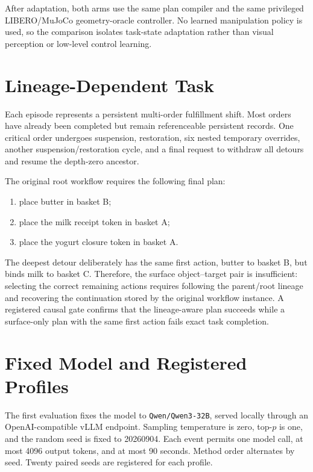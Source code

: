 \documentclass[10pt]{article}
\begin{document}
After adaptation, both arms use the same plan compiler and the same privileged
LIBERO/MuJoCo geometry-oracle controller.  No learned manipulation policy is
used, so the comparison isolates task-state adaptation rather than visual
perception or low-level control learning.

\section{Lineage-Dependent Task}

Each episode represents a persistent multi-order fulfillment shift.  Most
orders have already been completed but remain referenceable persistent records.
One critical order undergoes suspension, restoration, six nested temporary
overrides, another suspension/restoration cycle, and a final request to withdraw
all detours and resume the depth-zero ancestor.

The original root workflow requires the following final plan:
\begin{enumerate}
    \item place butter in basket B;
    \item place the milk receipt token in basket A;
    \item place the yogurt closure token in basket A.
\end{enumerate}
The deepest detour deliberately has the same first action, butter to basket B,
but binds milk to basket C.  Therefore, the surface object--target pair is
insufficient: selecting the correct remaining actions requires following the
parent/root lineage and recovering the continuation stored by the original
workflow instance.  A registered causal gate confirms that the lineage-aware
plan succeeds while a surface-only plan with the same first action fails exact
task completion.

\section{Fixed Model and Registered Profiles}

The first evaluation fixes the model to \texttt{Qwen/Qwen3-32B}, served locally
through an OpenAI-compatible vLLM endpoint.  Sampling temperature is zero,
top-$p$ is one, and the random seed is fixed to 20260904.  Each event permits
one model call, at most 4096 output tokens, and at most 90 seconds.  Method order
alternates by seed.  Twenty paired seeds are registered for each profile.
\end{document}
